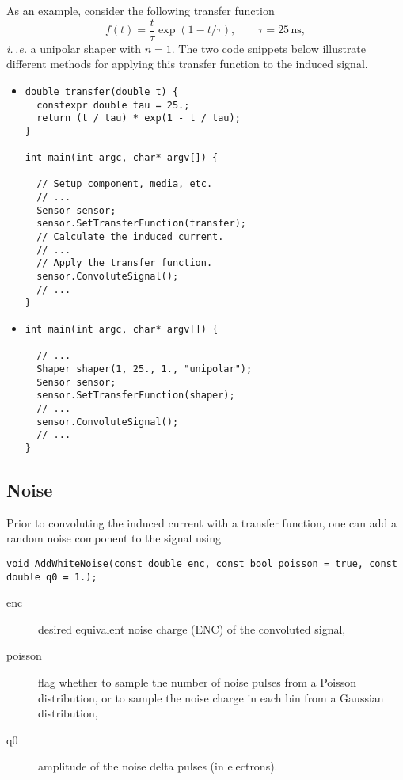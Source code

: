 As an example, consider the following transfer function
\begin{equation*}
  f\left(t\right) = \frac{t}{\tau}\exp\left(1 - t/\tau\right), \qquad
  \tau = 25\,\text{ns},
\end{equation*}
\textit{i.\,.e.} a unipolar shaper with $n = 1$. The two code snippets 
below illustrate different methods for applying this transfer function 
to the induced signal. 
\begin{itemize}
\item 
\begin{lstlisting}
double transfer(double t) {
  constexpr double tau = 25.;
  return (t / tau) * exp(1 - t / tau);
}

int main(int argc, char* argv[]) {

  // Setup component, media, etc.
  // ...
  Sensor sensor;
  sensor.SetTransferFunction(transfer);
  // Calculate the induced current.
  // ...
  // Apply the transfer function.
  sensor.ConvoluteSignal();
  // ...
}
\end{lstlisting}

\item

\begin{lstlisting}
int main(int argc, char* argv[]) {

  // ...
  Shaper shaper(1, 25., 1., "unipolar");
  Sensor sensor;
  sensor.SetTransferFunction(shaper);
  // ...
  sensor.ConvoluteSignal();
  // ...
}
\end{lstlisting}
\end{itemize}

\subsection{Noise}
Prior to convoluting the induced current with a transfer function, 
one can add a random noise component to the signal using 
\begin{lstlisting}
void AddWhiteNoise(const double enc, const bool poisson = true, const double q0 = 1.);
\end{lstlisting}
\begin{description}
  \item[enc] desired equivalent noise charge (ENC) of the convoluted signal,
  \item[poisson] flag whether to sample the number of noise pulses 
    from a Poisson distribution, or to sample the noise charge in each 
    bin from a Gaussian distribution,
  \item[q0] amplitude of the noise delta pulses (in electrons). 
\end{description} 

